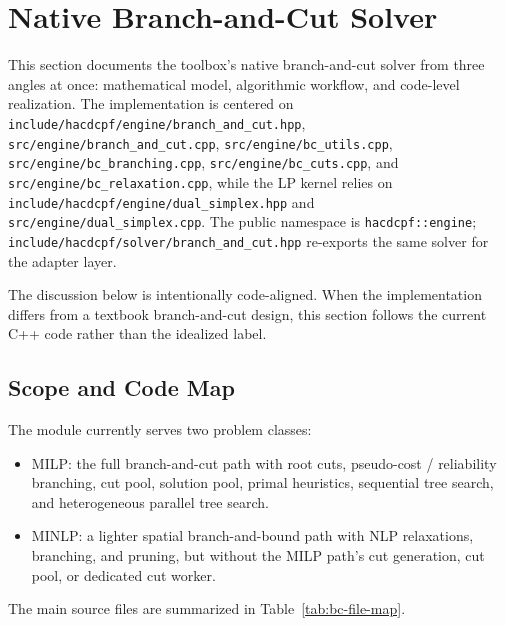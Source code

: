 \section{Native Branch-and-Cut Solver}
\label{sec:native-branch-and-cut}

This section documents the toolbox's native branch-and-cut solver from three angles at once: mathematical model, algorithmic workflow, and code-level realization. The implementation is centered on
\texttt{include/hacdcpf/engine/branch_and_cut.hpp},
\texttt{src/engine/branch_and_cut.cpp},
\texttt{src/engine/bc\_utils.cpp},
\texttt{src/engine/bc\_branching.cpp},
\texttt{src/engine/bc\_cuts.cpp}, and
\texttt{src/engine/bc\_relaxation.cpp}, while the LP kernel relies on
\texttt{include/hacdcpf/engine/dual_simplex.hpp} and
\texttt{src/engine/dual_simplex.cpp}.
The public namespace is \texttt{hacdcpf::engine};
\texttt{include/hacdcpf/solver/branch_and_cut.hpp} re-exports the same solver for the adapter layer.

The discussion below is intentionally code-aligned. When the implementation differs from a textbook branch-and-cut design, this section follows the current C++ code rather than the idealized label.

\subsection{Scope and Code Map}

The module currently serves two problem classes:
\begin{itemize}
  \item MILP: the full branch-and-cut path with root cuts, pseudo-cost / reliability branching, cut pool, solution pool, primal heuristics, sequential tree search, and heterogeneous parallel tree search.
  \item MINLP: a lighter spatial branch-and-bound path with NLP relaxations, branching, and pruning, but without the MILP path's cut generation, cut pool, or dedicated cut worker.
\end{itemize}

The main source files are summarized in Table~\ref{tab:bc-file-map}.

